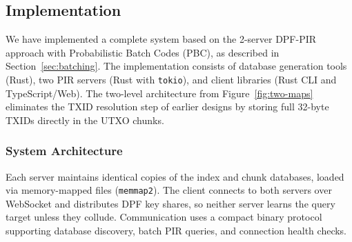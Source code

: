 \subsection{Implementation}
\label{sec:implementation}

We have implemented a complete system based on the 2-server DPF-PIR approach with Probabilistic Batch Codes (PBC), as described in Section~\ref{sec:batching}. The implementation consists of database generation tools (Rust), two PIR servers (Rust with \texttt{tokio}), and client libraries (Rust CLI and TypeScript/Web). The two-level architecture from Figure~\ref{fig:two-maps} eliminates the TXID resolution step of earlier designs by storing full 32-byte TXIDs directly in the UTXO chunks.

\subsubsection{System Architecture}

Each server maintains identical copies of the index and chunk databases, loaded via memory-mapped files (\texttt{memmap2}). The client connects to both servers over WebSocket and distributes DPF key shares, so neither server learns the query target unless they collude. Communication uses a compact binary protocol supporting database discovery, batch PIR queries, and connection health checks.


